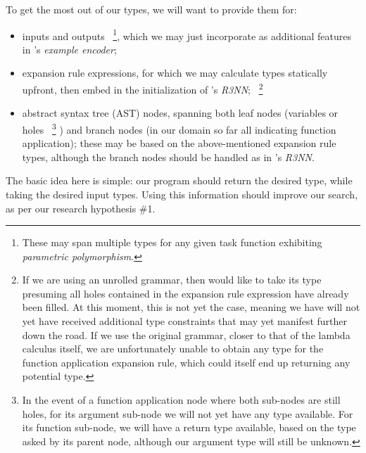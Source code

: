 \documentclass{article}
\begin{document}
To get the most out of our types, we will want to provide them for:
\begin{itemize}
    \item inputs and outputs%
    ~\footnote{
        These may span multiple types for any given task function exhibiting \emph{parametric polymorphism}.
    },
    which we may just incorporate as additional features in \citet{nsps}'s \emph{example encoder};
    \item expansion rule expressions, for which we may calculate types statically upfront, then embed
    in the initialization of \citet{nsps}'s \emph{R3NN};%
    ~\footnote{
        If we are using an unrolled grammar,
        then would like to take its type presuming all holes contained in the expansion rule expression have already been filled.
        At this moment, this is not yet the case,
        meaning we have will not yet have received additional type constraints that may yet manifest further down the road.
        If we use the original grammar,
        closer to that of the lambda calculus itself,
        we are unfortunately unable to obtain any type for the function application expansion rule,
        which could itself end up returning any potential type.
    }
    \item abstract syntax tree (AST) nodes, spanning both leaf nodes (variables or holes%
    ~\footnote{
        In the event of a function application node where both sub-nodes are still holes,
        for its argument sub-node we will not yet have any type available.
        For its function sub-node, we will have a return type available,
        based on the type asked by its parent node,
        although our argument type will still be unknown.
    }
    ) and branch nodes (in our domain so far all indicating function application); these may be based on the above-mentioned expansion rule types, although the branch nodes should be handled as in \citet{nsps}'s \emph{R3NN}.
\end{itemize}

The basic idea here is simple: our program should return the desired type, while taking the desired input types.
Using this information should improve our search,
as per our research hypothesis \#1.

\end{document}
